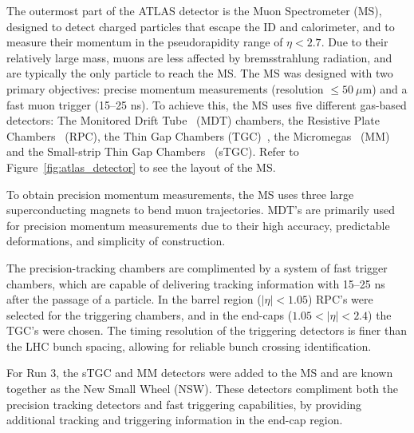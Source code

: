 The outermost part of the ATLAS detector is the Muon Spectrometer (MS), designed to detect charged particles that escape the ID and calorimeter, and to measure their momentum in the pseudorapidity range of $\eta < 2.7$. Due to their relatively large mass, muons are less affected by bremsstrahlung radiation, and are typically the only particle to reach the MS\@. The MS was designed with two primary objectives: precise momentum measurements (resolution $\leq 50 ~\mu$m) and a fast muon trigger (15--25 ns). To achieve this, the MS uses five different gas-based detectors: The Monitored Drift Tube~\cite{atlas_mdt_paper} (MDT) chambers, the Resistive Plate Chambers~\cite{atlas_run3_rpc_paper} (RPC), the Thin Gap Chambers (TGC)~\cite{atlas_tgc_paper}, the Micromegas~\cite{atlas_mm_paper} (MM) and the Small-strip Thin Gap Chambers~\cite{atlas_stgc_paper} (sTGC). Refer to Figure~\ref{fig:atlas_detector} to see the layout of the MS\@.

To obtain precision momentum measurements, the MS uses three large superconducting magnets to bend muon trajectories. MDT's are primarily used for precision momentum measurements due to their high accuracy, predictable deformations, and simplicity of construction.

The precision-tracking chambers are complimented by a system of fast trigger chambers, which are capable of delivering tracking information with 15--25 ns after the passage of a particle. In the barrel region ($|\eta| < 1.05$) RPC's were selected for the triggering chambers, and in the end-caps ($1.05 < |\eta| < 2.4$) the TGC's were chosen. The timing resolution of the triggering detectors is finer than the LHC bunch spacing, allowing for reliable bunch crossing identification.

For Run 3, the sTGC and MM detectors were added to the MS and are known together as the New Small Wheel (NSW). These detectors compliment both the precision tracking detectors and fast triggering capabilities, by providing additional tracking and triggering information in the end-cap region.

